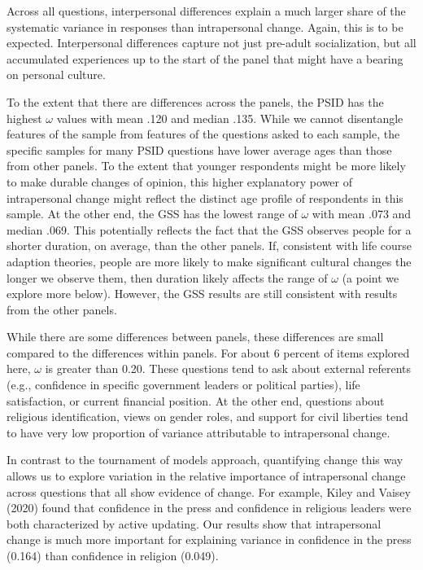 \documentclass[
  12pt,
]{article}
\begin{document}
Across all questions, interpersonal differences explain a much larger
share of the systematic variance in responses than intrapersonal change.
Again, this is to be expected. Interpersonal differences capture not
just pre-adult socialization, but all accumulated experiences up to the
start of the panel that might have a bearing on personal culture.

To the extent that there are differences across the panels, the PSID has
the highest \(\omega\) values with mean .120 and median .135. While we
cannot disentangle features of the sample from features of the questions
asked to each sample, the specific samples for many PSID questions have
lower average ages than those from other panels. To the extent that
younger respondents might be more likely to make durable changes of
opinion, this higher explanatory power of intrapersonal change might
reflect the distinct age profile of respondents in this sample. At the
other end, the GSS has the lowest range of \(\omega\) with mean .073 and
median .069. This potentially reflects the fact that the GSS observes
people for a shorter duration, on average, than the other panels. If,
consistent with life course adaption theories, people are more likely to
make significant cultural changes the longer we observe them, then
duration likely affects the range of \(\omega\) (a point we explore more
below). However, the GSS results are still consistent with results from
the other panels.

While there are some differences between panels, these differences are
small compared to the differences within panels. For about 6 percent of
items explored here, \(\omega\) is greater than 0.20. These questions
tend to ask about external referents (e.g., confidence in specific
government leaders or political parties), life satisfaction, or current
financial position. At the other end, questions about religious
identification, views on gender roles, and support for civil liberties
tend to have very low proportion of variance attributable to
intrapersonal change.

In contrast to the tournament of models approach, quantifying change
this way allows us to explore variation in the relative importance of
intrapersonal change across questions that all show evidence of change.
For example, Kiley and Vaisey (2020) found that confidence in the press
and confidence in religious leaders were both characterized by active
updating. Our results show that intrapersonal change is much more
important for explaining variance in confidence in the press (0.164)
than confidence in religion (0.049).
\end{document}
